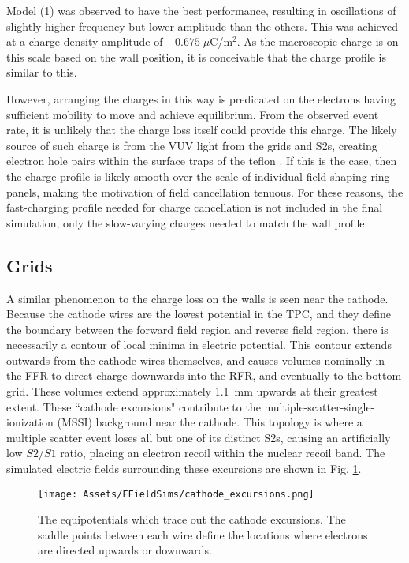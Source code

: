 Model (1) was observed to have the best performance, resulting in oscillations of slightly higher frequency but lower amplitude than the others.
This was achieved at a charge density amplitude of $-0.675\; \mu$C/m$^2$.
As the macroscopic charge is on this scale based on the wall position, it is conceivable that the charge profile is similar to this.

However, arranging the charges in this way is predicated on the electrons having sufficient mobility to move and achieve equilibrium.
From the observed event rate, it is unlikely that the charge loss itself could provide this charge.
The likely source of such charge is from the VUV light from the grids and S2s, creating electron hole pairs within the surface traps of the teflon \cite{zhang_surface_2006}.
If this is the case, then the charge profile is likely smooth over the scale of individual field shaping ring panels, making the motivation of field cancellation tenuous.
For these reasons, the fast-charging profile needed for charge cancellation is not included in the final simulation, only the  
slow-varying charges needed to match the wall profile.

\subsection{Grids}
A similar phenomenon to the charge loss on the walls is seen near the cathode. 
Because the cathode wires are the lowest potential in the TPC, and they define the boundary between the forward field region and reverse field region, there is necessarily a contour of local minima in electric potential.
This contour extends outwards from the cathode wires themselves, and causes volumes nominally in the FFR to direct charge downwards into the RFR, and eventually to the bottom grid.
These volumes extend approximately 1.1~mm upwards at their greatest extent.
These ``cathode excursions" contribute to the multiple-scatter-single-ionization (MSSI) background near the cathode.
This topology is where a multiple scatter event loses all but one of its distinct S2s, causing an artificially low $S2/S1$ ratio, placing an electron recoil within the nuclear recoil band.
The simulated electric fields surrounding these excursions are shown in Fig. \ref{fig:grid_fields}.

\begin{figure}
    \centering
    \texttt{[image: Assets/EFieldSims/cathode\_excursions.png]}
    \caption[The equipotentials which trace out the cathode excursions. ]%
    {The equipotentials which trace out the cathode excursions. The saddle points between each wire define the locations where electrons are directed upwards or downwards.}
    \label{fig:grid_fields}
\end{figure}

